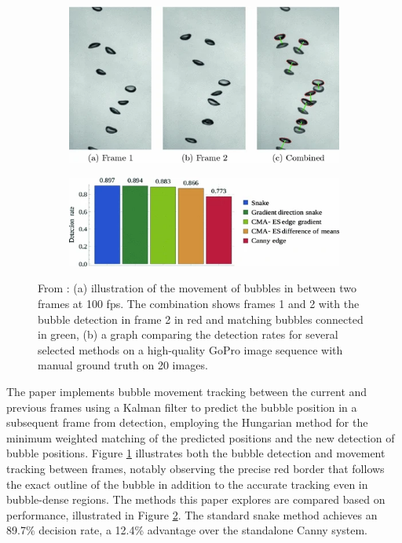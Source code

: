 \begin{figure}[h]
    \centering
    \begin{subfigure}{.40\textwidth}
        \centering
        \includegraphics[width=1\linewidth]{assets/zelenkaGasBubbleShape2014-movement_tracking.png}
        \caption{}
        \label{subfig:zelenka_tracking}
    \end{subfigure}
    \hfill
    \begin{subfigure}{.55\textwidth}
        \centering
        \includegraphics[width=1\linewidth]{assets/zelenkaGasBubbleShape2014-bubble-detection-methods-comparison.png}
        \caption{}
        \label{subfig:zelenka_compare}
    \end{subfigure}
    \caption{From \cite{zelenkaGasBubbleShape2014}: (a) illustration of the movement of bubbles in between two frames at 100 fps. The combination shows frames 1 and 2 with the bubble detection in frame 2 in red and matching bubbles connected in green, (b) a graph comparing the detection rates for several selected methods on a high-quality GoPro image sequence with manual ground truth on 20 images.}
    \label{fig:zelenka}
\end{figure}

The paper implements bubble movement tracking between the current and previous frames using a Kalman filter \cite{kalmanNewApproachLinear1960} to predict the bubble position in a subsequent frame from detection, employing the Hungarian method \cite{kuhnHungarianMethodAssignment1955} for the minimum weighted matching of the predicted positions and the new detection of bubble positions. Figure \ref{subfig:zelenka_tracking} illustrates both the bubble detection and movement tracking between frames, notably observing the precise red border that follows the exact outline of the bubble in addition to the accurate tracking even in bubble-dense regions. The methods this paper explores are compared based on performance, illustrated in Figure \ref{subfig:zelenka_compare}. The standard snake method achieves an 89.7\% decision rate, a 12.4\% advantage over the standalone Canny system.

